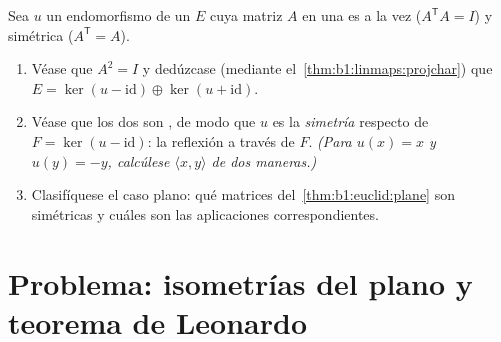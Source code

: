 \begin{exercise}[$\star\star\star$]\label{exo:b1:euclid:12}
Sea $u$ un endomorfismo de un  $E$ cuya matriz $A$
en una   es a la vez 
($A^{\mathsf T}A = I$) y simétrica ($A^{\mathsf T} = A$).
\begin{enumerate}
  \item Véase que $A^2 = I$ y dedúzcase (mediante
        el~\cref{thm:b1:linmaps:projchar}) que
        $E = \ker(u - \mathrm{id}) \oplus \ker(u + \mathrm{id})$.
  \item Véase que los dos  son , de modo que
        $u$ es la \emph{simetría } respecto de
        $F = \ker(u - \mathrm{id})$: la reflexión a través de $F$.
        \emph{(Para $u(x) = x$ y $u(y) = -y$, calcúlese
        $\langle x, y\rangle$ de dos maneras.)}
  \item Clasifíquese el caso plano: qué matrices
        del~\cref{thm:b1:euclid:plane} son simétricas y cuáles son
        las aplicaciones correspondientes.
\end{enumerate}
\end{exercise}

\section{Problema: isometrías del plano y teorema de Leonardo}

